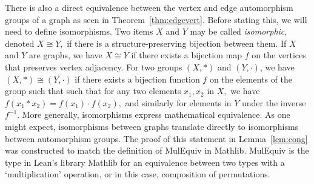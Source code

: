 \documentclass{article}
\begin{document}
There is also a direct equivalence between the vertex and edge automorphism groups of a graph as seen in Theorem~\ref{thm:edgevert}. Before stating this, we will need to define isomorphisms. Two items $X$ and $Y$ may be called \textit{isomorphic}, denoted $X \cong Y,$ if there is a structure-preserving bijection between them. If $X$ and $Y$ are graphs, we have $X \cong Y$ if there exists a bijection map $f$ on the vertices that preserves vertex adjacency. For two groups $(X, *)$ and $ (Y, \cdot)$, we have $(X, *) \cong (Y, \cdot)$ if there exists a bijection function $f$ on the elements of the group such that such that for any two elements $x_1, x_2$ in $X,$ we have $f(x_1 * x_2) = f(x_1) \cdot f(x_2),$ and similarly for elements in $Y$ under the inverse $f^{-1}$. More generally, isomorphisms express mathematical equivalence. As one might expect, isomorphisms between graphs translate directly to isomorphisms between automorphism groups. The proof of this statement in Lemma~\ref{lem:cong} was constructed to match the definition of {\sc MulEquiv} in Mathlib. {\sc MulEquiv} is the type in Lean's library Mathlib for an equivalence between two types with a `multiplication' operation, or in this case, composition of permutations.  
\end{document}
